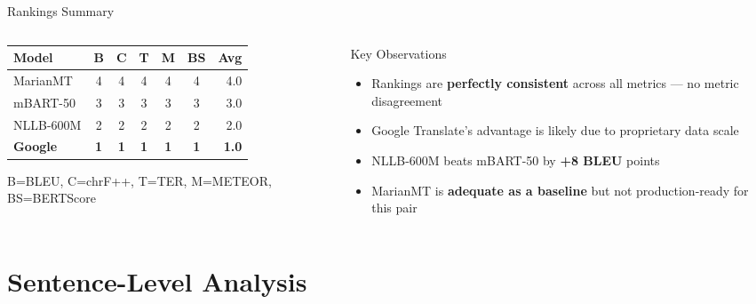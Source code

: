 \documentclass[aspectratio=169]{beamer}
\newcommand{\rowGold}{\rowcolor{mtgold!20}}
\begin{document}
\begin{frame}{Rankings Summary}
  \begin{columns}[T]
    \begin{column}{0.55\textwidth}
      \centering
      \renewcommand{\arraystretch}{1.4}
      \begin{tabular}{lcccccr}
        \toprule
        \textbf{Model} & \textbf{B} & \textbf{C} & \textbf{T} & \textbf{M} & \textbf{BS} & \textbf{Avg} \\
        \midrule
        MarianMT     & 4 & 4 & 4 & 4 & 4 & 4.0 \\
        mBART-50     & 3 & 3 & 3 & 3 & 3 & 3.0 \\
        NLLB-600M    & 2 & 2 & 2 & 2 & 2 & 2.0 \\
        \rowGold
        \textbf{Google}   & \textbf{1} & \textbf{1} & \textbf{1} & \textbf{1} & \textbf{1} & \textbf{1.0} \\
        \bottomrule
      \end{tabular}
      \vspace{0.2cm}
      {\footnotesize B=BLEU, C=chrF++, T=TER, M=METEOR, BS=BERTScore}
    \end{column}
    \begin{column}{0.42\textwidth}
      \begin{block}{Key Observations}
        \begin{itemize}
          \item Rankings are \textbf{perfectly consistent} across all metrics — no metric disagreement
          \item Google Translate's advantage is likely due to proprietary data scale
          \item NLLB-600M beats mBART-50 by \textbf{+8 BLEU} points
          \item MarianMT is \textbf{adequate as a baseline} but not production-ready for this pair
        \end{itemize}
      \end{block}
    \end{column}
  \end{columns}
\end{frame}

\section{Sentence-Level Analysis}
\end{document}
